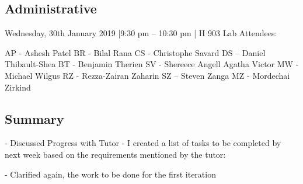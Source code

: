 \documentclass[12pt]{article}
\begin{document}
\subsection{Administrative}
Wednesday, 30th January 2019 |9:30 pm – 10:30 pm | H 903 Lab
Attendees: 

AP - Ashesh Patel
BR - Bilal Rana
CS - Christophe Savard
DS – Daniel Thibault-Shea
BT - Benjamin Therien
SV - Shereece Angell Agatha Victor
MW - Michael Wilgus
RZ - Rezza-Zairan Zaharin
SZ – Steven Zanga
MZ - Mordechai Zirkind





\subsection{Summary}
-	Discussed Progress with Tutor 
-	I created a list of tasks to be completed by next week based on the requirements mentioned by the tutor:

-	Clarified again, the work to be done for the first iteration 




\pagebreak
\end{document}
